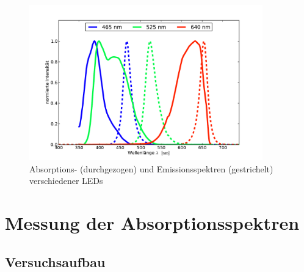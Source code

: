 \documentclass[11pt]{scrartcl}
\begin{document}
\begin{figure}[ht]
\begin{center}
\includegraphics[width=0.9\textwidth]{images/absorp-emit.pdf}
\end{center}
\vspace{-1.5\baselineskip}
\caption{Absorptions- (durchgezogen) und Emissionsspektren (gestrichelt) verschiedener LEDs}
\label{Absorption und Emission von LEDs}
\end{figure}



\section{Messung der Absorptionsspektren}

\subsection{Versuchsaufbau}
\end{document}

